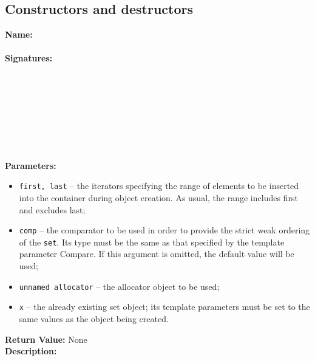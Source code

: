 \subsection{Constructors and destructors} %
\textbf{Name: }\\\\
\textbf{Signatures: }\\
 \\
 \\
 \\
 \\
 \\
 \\
 \\
\\
\textbf{Parameters: }\\
\begin{itemize}
  \item \texttt{first, last} – the iterators specifying the range of elements to be inserted into 
    the container during object creation. As usual, the range includes first and excludes last;
  \item \texttt{comp} – the comparator to be used in order to provide the strict weak ordering of 
    the \texttt{set}. Its type must be the same as that specified by the template parameter Compare. 
    If this argument is omitted, the default value will be used;
  \item \texttt{unnamed allocator} – the allocator object to be used;
  \item \texttt{x} – the already existing set object; its template parameters must be set to the same values as 
    the object being created.
\end{itemize}
\textbf{Return Value: }None\\
\textbf{Description: }\\
